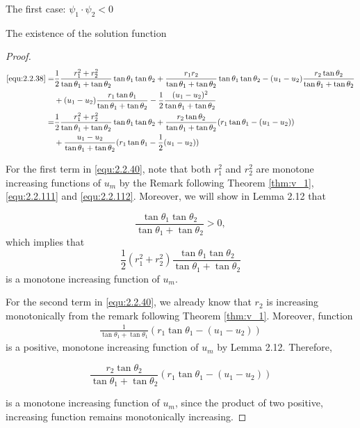 \documentclass[letterpaper,reqno,10pt,twoside]{amsart}
\theoremstyle{definition}
\theoremstyle{remark}
\begin{document}
\begin{section}{The first case: $\psi_1\cdot \psi_2<0$ }
\begin{subsection}{The existence of the solution function}
\begin{proof}
    \begin{align}
         \eqref{equ:2.2.38}=&\frac{1}{2}\frac{r_1^{2}+r_2^{2}}{\tan\theta_1+\tan\theta_2}\tan\theta_1\tan\theta_2+\frac{r_1r_2}{\tan\theta_1+\tan\theta_2}\tan\theta_1\tan\theta_2-(u_1-u_2)\frac{r_2\tan\theta_2}{\tan\theta_1+\tan\theta_2} \notag\\
         &+(u_1-u_2)\frac{r_1\tan\theta_1}{\tan\theta_1+\tan\theta_2}-\frac{1}{2}\frac{(u_1-u_2)^{2}}{\tan\theta_1+\tan\theta_2} \notag\\
         =&\frac{1}{2}\frac{r_1^{2}+r_2^{2}}{\tan\theta_1+\tan\theta_2}\tan\theta_1\tan\theta_2+\frac{r_2\tan\theta_2}{\tan\theta_1+\tan\theta_2}(r_1\tan\theta_1-(u_1-u_2))\notag \\
         &+\frac{u_1-u_2}{\tan\theta_1+\tan\theta_2}(r_1\tan\theta_1-\frac{1}{2}(u_1-u_2)) \label{equ:2.2.40}
    \end{align}
    

   \noindent For the first term in \eqref{equ:2.2.40}, note that both $r_1^{2}$ and $r_2^{2}$ are monotone increasing functions of $u_m$ by the Remark following Theorem \ref{thm:v_1}, \eqref{equ:2.2.111} and \eqref{equ:2.2.112}. Moreover, we will show in Lemma 2.12 that

   \begin{equation*}
       \frac{\tan\theta_{1}\tan\theta_{2}}{\tan\theta_{1}+\tan\theta_{2}}>0,
   \end{equation*}
   \noindent which implies that
   \begin{equation*}
       \frac{1}{2}(r_{1}^{2}+r_{2}^{2})\frac{\tan\theta_{1}\tan\theta_{2}}{\tan\theta_{1}+\tan\theta_{2}}
   \end{equation*}
   \noindent is a monotone increasing function of $u_{m}$.
   
   For the second term in \eqref{equ:2.2.40}, we already know that $r_{2}$ is increasing monotonically from the remark following Theorem \ref{thm:v_1}. Moreover, function 
   \begin{align}
   \frac{1}{\tan\theta_1+\tan\theta_1}(r_1\tan\theta_1-(u_1-u_2))
   \end{align}
   is a positive, monotone increasing function of $u_{m}$ by Lemma 2.12. Therefore,

   \begin{equation*}
       \frac{r_2\tan\theta_2}{\tan\theta_1+\tan\theta_2}(r_1\tan\theta_1-(u_1-u_2))
   \end{equation*}

   \noindent is a monotone increasing function of $u_{m}$, since the product of two positive, increasing function remains monotonically increasing.
   

\end{proof}
\end{subsection}
\end{section}
\end{document}
